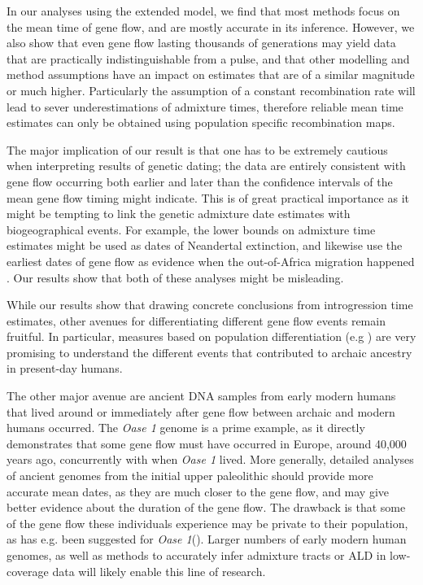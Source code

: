 \documentclass[]{article}
\begin{document}
In our analyses using the extended model, we find that most methods focus on the mean time of gene flow, and are mostly accurate in its inference. However, we also show that even gene flow lasting thousands of generations may yield data that are practically indistinguishable from a pulse, and that other modelling and method assumptions have an impact on estimates that are of a similar magnitude or much higher. Particularly the assumption of a constant recombination rate will lead to sever underestimations of admixture times, therefore reliable mean time estimates can only be obtained using population specific recombination maps.

The major implication of our result is that one has to be extremely cautious when interpreting results of genetic dating; the data are entirely consistent with gene flow occurring both earlier and later than the confidence intervals of the mean gene flow timing might indicate. This is of great practical importance as it might be tempting to link the genetic admixture date estimates with biogeographical events. For example, the lower bounds on admixture time estimates might be used as dates of Neandertal extinction, and likewise use the earliest dates of gene flow as evidence when the out-of-Africa migration happened \citep{sankararaman_date_2012}. Our results show that both of these analyses might be misleading.


While our results show that drawing concrete conclusions from introgression time estimates, other avenues for differentiating different gene flow events remain fruitful.
In particular, measures based on population differentiation (e.g \cite{browning_analysis_2018,wall_higher_2013,villanea_multiple_2019,jacobs_multiple_2019}) are very promising to understand the different events that contributed to archaic ancestry in present-day humans. 

The other major avenue are ancient DNA samples from early modern humans that lived around or immediately after gene flow between archaic and modern humans occurred. The \textit{Oase 1} genome is a prime example, as it directly demonstrates that some gene flow must have occurred in Europe, around 40,000 years ago, concurrently with when \textit{Oase 1} lived. More generally, detailed analyses of ancient genomes from the initial upper paleolithic should provide more accurate mean dates, as they are much closer to the gene flow, and may give better evidence about the duration of the gene flow. The drawback is that some of the gene flow these individuals experience may be private to their population, as has e.g. been suggested for \textit{Oase 1}(\cite{fu_genome_2014}). Larger numbers of early modern human genomes, as well as methods to accurately infer admixture tracts or ALD in low-coverage data will likely enable this line of research. 
\end{document}
